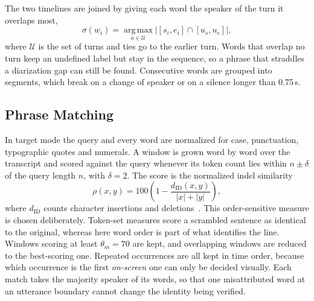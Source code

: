 \documentclass[conference]{IEEEtran}
\begin{document}
The two timelines are joined by giving each word the speaker of the turn it overlaps most,
\begin{equation}
\sigma(w_i)=\operatorname*{arg\,max}_{u\in\mathcal{U}} \bigl|[s_i,e_i]\cap[u_s,u_e]\bigr| ,
\label{eq:align}
\end{equation}
where $\mathcal{U}$ is the set of turns and ties go to the earlier turn. Words that overlap no turn keep an undefined label but stay in the sequence, so a phrase that straddles a diarization gap can still be found. Consecutive words are grouped into segments, which break on a change of speaker or on a silence longer than 0.75\,s.

\subsection{Phrase Matching}
In target mode the query and every word are normalized for case, punctuation, typographic quotes and numerals. A window is grown word by word over the transcript and scored against the query whenever its token count lies within $n\pm\delta$ of the query length $n$, with $\delta=2$. The score is the normalized indel similarity
\begin{equation}
\rho(x,y)=100\left(1-\frac{d_{\mathrm{ID}}(x,y)}{|x|+|y|}\right),
\label{eq:match}
\end{equation}
where $d_{\mathrm{ID}}$ counts character insertions and deletions~\cite{levenshtein1966,rapidfuzz}. This order-sensitive measure is chosen deliberately. Token-set measures score a scrambled sentence as identical to the original, whereas here word order is part of what identifies the line. Windows scoring at least $\theta_m=70$ are kept, and overlapping windows are reduced to the best-scoring one. Repeated occurrences are all kept in time order, because which occurrence is the first \emph{on-screen} one can only be decided visually. Each match takes the majority speaker of its words, so that one misattributed word at an utterance boundary cannot change the identity being verified.
\end{document}

